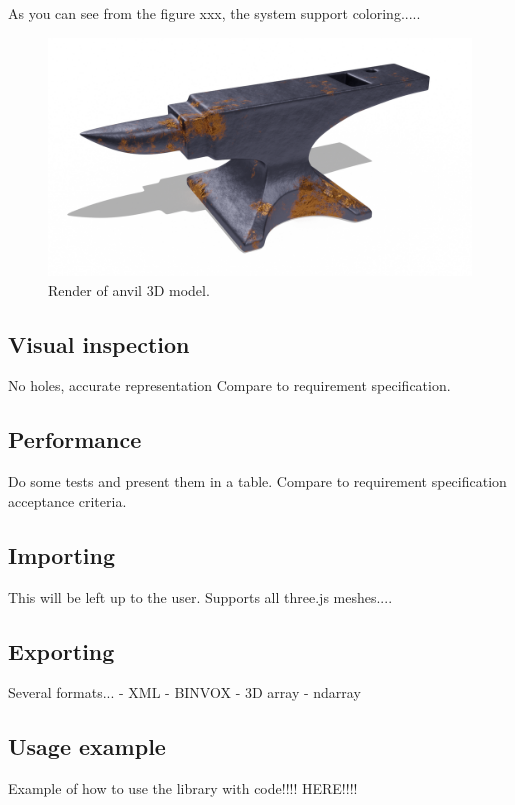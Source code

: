 As you can see from the figure xxx, the system support coloring.....
\begin{figure}[h]
    \centering
    \includegraphics[width=\textwidth]{sections/result/figures/anvil-render.png}
    \caption{Render of anvil 3D model.}
    \label{fig:anvil-render}
\end{figure}

\subsection{Visual inspection}
No holes, accurate representation
Compare to requirement specification.

\subsection{Performance}
Do some tests and present them in a table.
Compare to requirement specification acceptance criteria.

\subsection{Importing}
This will be left up to the user. Supports all three.js meshes....

\subsection{Exporting}
Several formats...
- XML
- BINVOX
- 3D array
- ndarray

\subsection{Usage example}
Example of how to use the library with code!!!! HERE!!!!


